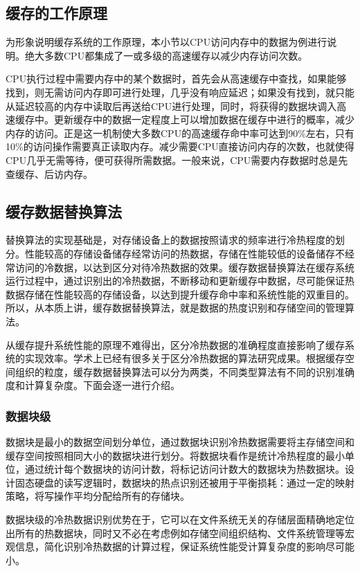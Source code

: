 \subsection{缓存的工作原理}
为形象说明缓存系统的工作原理，本小节以CPU访问内存中的数据为例进行说明。绝大多数CPU都集成了一或多级的高速缓存以减少内存访问次数。

CPU执行过程中需要内存中的某个数据时，首先会从高速缓存中查找，如果能够找到，则无需访问内存即可进行处理，几乎没有响应延迟；如果没有找到，就只能从延迟较高的内存中读取后再送给CPU进行处理，同时，将获得的数据块调入高速缓存中。更新缓存中的数据一定程度上可以增加数据在缓存中进行的概率，减少内存的访问。正是这一机制使大多数CPU的高速缓存命中率可达到90\%左右，只有10\%的访问操作需要真正读取内存。减少需要CPU直接访问内存的次数，也就使得CPU几乎无需等待，便可获得所需数据。一般来说，CPU需要内存数据时总是先查缓存、后访内存。

\subsection{缓存数据替换算法}
替换算法的实现基础是，对存储设备上的数据按照请求的频率进行冷热程度的划分。性能较高的存储设备储存经常访问的热数据，存储在性能较低的设备储存不经常访问的冷数据，以达到区分对待冷热数据的效果。缓存数据替换算法在缓存系统运行过程中，通过识别出的冷热数据，不断移动和更新缓存中数据，尽可能保证热数据存储在性能较高的存储设备，以达到提升缓存命中率和系统性能的双重目的。所以，从本质上讲，缓存数据替换算法，就是数据的热度识别和存储空间的管理算法。

从缓存提升系统性能的原理不难得出，区分冷热数据的准确程度直接影响了缓存系统的实现效率。学术上已经有很多关于区分冷热数据的算法研究成果。根据缓存空间组织的粒度，缓存数据替换算法可以分为两类，不同类型算法有不同的识别准确度和计算复杂度。下面会逐一进行介绍。

\subsubsection{数据块级}

数据块是最小的数据空间划分单位，通过数据块识别冷热数据需要将主存储空间和缓存空间按照相同大小的数据块进行划分。将数据块看作是统计冷热程度的最小单位，通过统计每个数据块的访问计数，将标记访问计数大的数据块为热数据块。设计固态硬盘的读写逻辑时，数据块的热点识别还被用于平衡损耗：通过一定的映射策略，将写操作平均分配给所有的存储块。

数据块级的冷热数据识别优势在于，它可以在文件系统无关的存储层面精确地定位出所有的热数据块，同时又不必在考虑例如存储空间组织结构、文件系统管理等宏观信息，简化识别冷热数据的计算过程，保证系统性能受计算复杂度的影响尽可能小。

